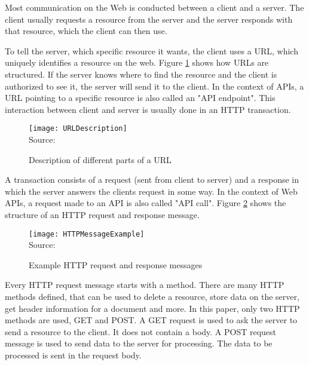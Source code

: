 Most communication on the Web is conducted between a client and a server. The client usually
requests a resource from the server and the server responds with that resource, which the client
can then use\cite[4]{gourley2002http}.


To tell the server, which specific resource it wants, the client uses a \ac{URL}, which 
uniquely identifies a resource on the web. 
Figure \ref{fig:Description of different parts of a URL} shows how URLs are structured.
If the server knows where to find the resource and the client is authorized to see it,
the server will send it to the client.
In the context of APIs, a URL pointing to a specific resource is also called an "API endpoint".\cite{Cooksey2014}
This interaction between client and server is usually done in an HTTP transaction.

\begin{figure}[H]
    \caption{Description of different parts of a URL}
	\label{fig:Description of different parts of a URL}
    \texttt{[image: URLDescription]}
    \\
    Source: \cite[24]{gourley2002http}
\end{figure}

A transaction consists of a request (sent from client to server) and a response in which the
server answers the clients request in some way.\cite[8]{gourley2002http}
In the context of Web APIs, a request made to an API is also called "API call".\cite{StoplightAPITypes}
Figure \ref{fig:Example HTTP request and response messages} shows the structure of an 
HTTP request and response message.

\begin{figure}[H]
    \caption{Example HTTP request and response messages}
	\label{fig:Example HTTP request and response messages}
    \texttt{[image: HTTPMessageExample]}
    \\
    Source: \cite[47]{gourley2002http}
\end{figure}

Every HTTP request message starts with a method.
There are many HTTP methods defined, that can be used to delete a resource, store
data on the server, get header information for a document and more.\cite[48]{gourley2002http}
In this paper, only two HTTP methods are used, GET and POST.
A GET request is used to ask the server to send a resource to the client.
It does not contain a body.\cite[48]{gourley2002http}
A POST request message is used to send data to the server for processing. The data to be
processed is sent in the request body.\cite[48]{gourley2002http}

